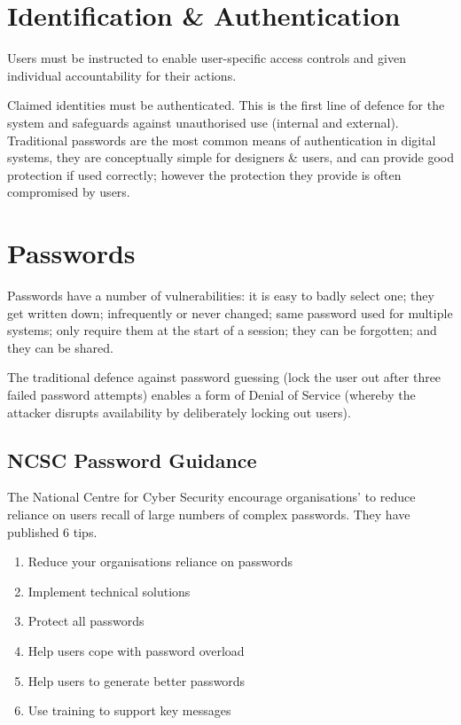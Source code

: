 
\section*{Identification \& Authentication}
Users must be instructed to enable user-specific access controls and given individual accountability for their actions.

Claimed identities must be authenticated. This is the first line of defence for the system and safeguards against unauthorised use (internal and external). Traditional passwords are the most common means of authentication in digital systems, they are conceptually simple for designers \& users, and can provide good protection if used correctly; however the protection they provide is often compromised by users. 

\section*{Passwords}
Passwords have a number of vulnerabilities: it is easy to badly select one; they get written down; infrequently or never changed; same password used for multiple systems; only require them at the start of a session; they can be forgotten; and they can be shared. 

The traditional defence against password guessing (lock the user out after three failed password attempts) enables a form of Denial of Service (whereby the attacker disrupts availability by deliberately locking out users).

\subsection*{NCSC Password Guidance}
The National Centre for Cyber Security encourage organisations' to reduce reliance on users recall of large numbers of complex passwords. They have published 6 tips.
\begin{enumerate}
    \item Reduce your organisations reliance on passwords
    \item Implement technical solutions
    \item Protect all passwords
    \item Help users cope with password overload
    \item Help users to generate better passwords
    \item Use training to support key messages
\end{enumerate}

